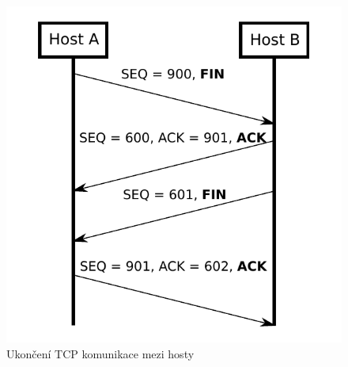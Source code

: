     \begin{figure}[!h]
      \begin{center}
        \includegraphics[scale=0.7]{obrazky/prace/FIN_TCP.pdf}
      \end{center}
      \caption[Ukončení spojení TCP]{Ukončení TCP komunikace mezi hosty \cite{Jerabek2013}}
      \label{obr:FIN_TCP}
    \end{figure}
    
